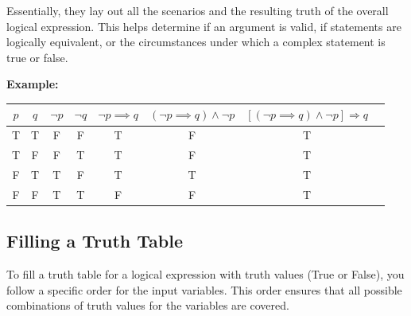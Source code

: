 Essentially, they lay out all the scenarios and the resulting truth of the overall logical expression.
This helps determine if an argument is valid, if statements are logically equivalent, or the circumstances
under which a complex statement is true or false.

\textbf{Example:}

\begin{center}
	\begin{tabular}{|c|c|c|c|c|c|c|c|}
		\hline
		\(p\) & \(q\) & \(\neg p\) & \(\neg q\) & \(\neg p \implies q\) & \((\neg p \implies q) \land \neg p\) & \(\left[(\neg p \implies q) \land \neg p\right] \Rightarrow q\) \\
		\hline
		T     & T     & F          & F          & T                     & F                                    & T                                                               \\
		T     & F     & F          & T          & T                     & F                                    & T                                                               \\
		F     & T     & T          & F          & T                     & T                                    & T                                                               \\
		F     & F     & T          & T          & F                     & F                                    & T                                                               \\
		\hline
	\end{tabular}
\end{center}

\subsection{Filling a Truth Table}
To fill a truth table for a logical expression with truth values (True or False), you follow a
specific order for the input variables. This order ensures that all possible combinations of truth values
for the variables are covered.

